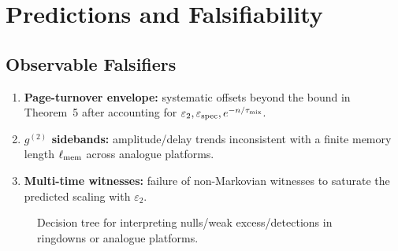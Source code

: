 \documentclass[aps,prd,preprint,onecolumn,superscriptaddress,nofootinbib,longbibliography,floatfix,11pt,showpacs,showkeys]{revtex4-2}
\theoremstyle{plain}
\theoremstyle{definition}
\theoremstyle{remark}
\begin{document}
\section{Predictions and Falsifiability}
\label{sec:predictions}

\subsection{Observable Falsifiers}
\begin{enumerate}
  \item \textbf{Page-turnover envelope:} systematic offsets beyond the bound in
        Theorem~5 after accounting for \(\varepsilon_2,\varepsilon_{\mathrm{spec}},e^{-n/\tau_{\rm mix}}\).
  \item \textbf{$g^{(2)}$ sidebands:} amplitude/delay trends inconsistent with a finite
        memory length \(\ell_{\rm mem}\) across analogue platforms.
  \item \textbf{Multi-time witnesses:} failure of non-Markovian witnesses to saturate
        the predicted scaling with \(\varepsilon_2\).
\end{enumerate}

\begin{figure}[t]
  \centering
  \caption{Decision tree for interpreting nulls/weak excess/detections in ringdowns or analogue platforms.}
  \label{fig:decision-tree}
\end{figure}
\end{document}

